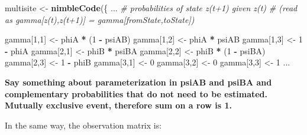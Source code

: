 \documentclass[
  12pt,
]{krantz}
\newenvironment{Shaded}{\begin{snugshade}}{\end{snugshade}}
\newcommand{\CommentTok}[1]{\textcolor[rgb]{0.56,0.35,0.01}{\textit{#1}}}
\newcommand{\DecValTok}[1]{\textcolor[rgb]{0.00,0.00,0.81}{#1}}
\newcommand{\FunctionTok}[1]{\textcolor[rgb]{0.13,0.29,0.53}{\textbf{#1}}}
\newcommand{\NormalTok}[1]{#1}
\newcommand{\OtherTok}[1]{\textcolor[rgb]{0.56,0.35,0.01}{#1}}
\newcommand{\SpecialCharTok}[1]{\textcolor[rgb]{0.81,0.36,0.00}{\textbf{#1}}}
\begin{document}
\begin{Shaded}
\begin{Highlighting}[]
\NormalTok{multisite }\OtherTok{\textless{}{-}} \FunctionTok{nimbleCode}\NormalTok{(\{}
\NormalTok{...}
  \CommentTok{\# probabilities of state z(t+1) given z(t)}
  \CommentTok{\# (read as gamma[z(t),z(t+1)] = gamma[fromState,toState])}

\NormalTok{  gamma[}\DecValTok{1}\NormalTok{,}\DecValTok{1}\NormalTok{] }\OtherTok{\textless{}{-}}\NormalTok{ phiA }\SpecialCharTok{*}\NormalTok{ (}\DecValTok{1} \SpecialCharTok{{-}}\NormalTok{ psiAB)}
\NormalTok{  gamma[}\DecValTok{1}\NormalTok{,}\DecValTok{2}\NormalTok{] }\OtherTok{\textless{}{-}}\NormalTok{ phiA }\SpecialCharTok{*}\NormalTok{ psiAB}
\NormalTok{  gamma[}\DecValTok{1}\NormalTok{,}\DecValTok{3}\NormalTok{] }\OtherTok{\textless{}{-}} \DecValTok{1} \SpecialCharTok{{-}}\NormalTok{ phiA}
\NormalTok{  gamma[}\DecValTok{2}\NormalTok{,}\DecValTok{1}\NormalTok{] }\OtherTok{\textless{}{-}}\NormalTok{ phiB }\SpecialCharTok{*}\NormalTok{ psiBA}
\NormalTok{  gamma[}\DecValTok{2}\NormalTok{,}\DecValTok{2}\NormalTok{] }\OtherTok{\textless{}{-}}\NormalTok{ phiB }\SpecialCharTok{*}\NormalTok{ (}\DecValTok{1} \SpecialCharTok{{-}}\NormalTok{ psiBA)}
\NormalTok{  gamma[}\DecValTok{2}\NormalTok{,}\DecValTok{3}\NormalTok{] }\OtherTok{\textless{}{-}} \DecValTok{1} \SpecialCharTok{{-}}\NormalTok{ phiB}
\NormalTok{  gamma[}\DecValTok{3}\NormalTok{,}\DecValTok{1}\NormalTok{] }\OtherTok{\textless{}{-}} \DecValTok{0}
\NormalTok{  gamma[}\DecValTok{3}\NormalTok{,}\DecValTok{2}\NormalTok{] }\OtherTok{\textless{}{-}} \DecValTok{0}
\NormalTok{  gamma[}\DecValTok{3}\NormalTok{,}\DecValTok{3}\NormalTok{] }\OtherTok{\textless{}{-}} \DecValTok{1}
\NormalTok{...}
\end{Highlighting}
\end{Shaded}

\textbf{Say something about parameterization in psiAB and psiBA and complementary probabilities that do not need to be estimated. Mutually exclusive event, therefore sum on a row is 1. }

In the same way, the observation matrix is:
\end{document}

